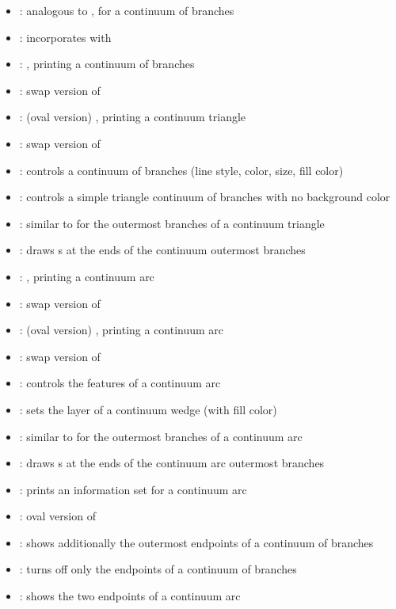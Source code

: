\begin{itemize}
\item \cmd{\cntmdistance}: analogous to \cmd{\xtdistance}, for a continuum of branches
\item \cmd{\cntmdistance*}: incorporates \cmd{\cntmdistance} with \cmd{\xtdistance}
\item \cmd{\istrootcntm}: \cmd{\istroot} \xw{+} , printing a continuum of branches
\item {}: swap version of \cmd{\istrootcntm}
\item \cmd{\istrootocntm}: (oval version) \cmd{\istrooto} \xw{+} , printing a continuum triangle
\item {}: swap version of \cmd{\istrootocntm}
\item \cmd{\cntmpreset}: controls a continuum of branches (line style, color, size, fill color)
\item \cmd{\cntmpreset*}: controls a simple triangle continuum of branches with no background color
\item \cmd{\cntmistb}: similar to \cmd{\istb} for the outermost branches of a continuum triangle
\item \cmd{\cntmistb*}: draws s at the ends of the continuum outermost branches
\item \cmd{\istrootcntmA}: \cmd{\istroot} \xw{+} , printing a continuum arc
\item {}: swap version of \cmd{\istrootcntmA}
\item \cmd{\istrootocntmA}: (oval version) \cmd{\istrooto} \xw{+} , printing a continuum arc
\item {}: swap version of \cmd{\istrootocntmA}
\item \cmd{\cntmApreset}: controls the features of a continuum arc
\item \cmd{\cntmAlayerpreset}: sets the layer of a continuum wedge (with fill color)
\item \cmd{\cntmAistb}: similar to \cmd{\istb} for the outermost branches of a continuum arc
\item \cmd{\cntmAistb*}: draws s at the ends of the continuum arc outermost branches
\item \cmd{\cntmAInfoset}: prints an information set for a continuum arc
\item \cmd{\cntmAInfosetO}: oval version of \cmd{\cntmAInfoset}
\item \cmd{\xtShowEndPoints*}: shows additionally the outermost endpoints of a continuum of branches
\item \cmd{\xtHideEnpPoints*}: turns off only the endpoints of a continuum of branches
\item \cmd{\cntmAexpostShowEndPoints}: shows the two endpoints of a continuum arc
%
\listdivider


\end{itemize}
